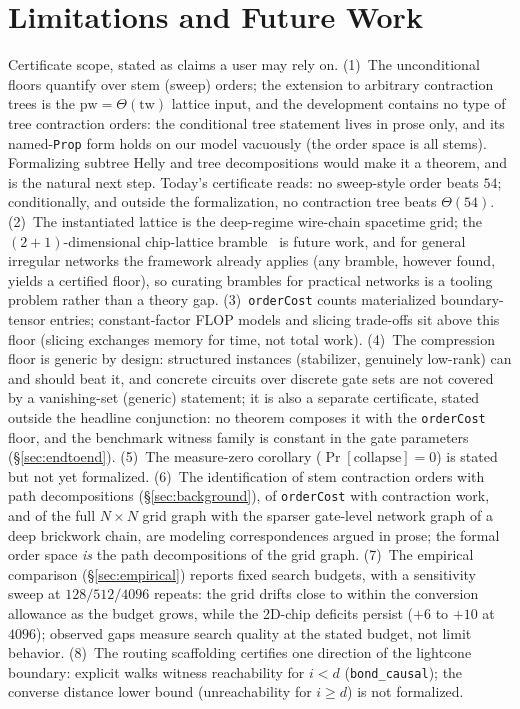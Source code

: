 \documentclass[sigplan,10pt,screen,review,anonymous]{acmart}
\newcommand{\pw}{\mathrm{pw}}
\newcommand{\tw}{\mathrm{tw}}
\begin{document}
\section{Limitations and Future Work}\label{sec:limits}

Certificate scope, stated as claims a user may rely on. (1)~The unconditional floors
quantify over stem (sweep) orders; the extension to arbitrary contraction trees is the
$\pw=\Theta(\tw)$ lattice input, and the development contains no type of tree contraction
orders: the conditional tree statement lives in prose only, and its named-\lstinline|Prop|
form holds on our model vacuously (the order space is all stems). Formalizing subtree
Helly and tree decompositions would make it a theorem, and is the natural next step. Today's
certificate reads: no sweep-style order beats $54$; conditionally, and outside the
formalization, no contraction tree beats $\Theta(54)$. (2)~The instantiated lattice is the deep-regime wire-chain spacetime
grid; the $(2{+}1)$-dimensional chip-lattice bramble~\cite{kozawa2014treewidth} is future
work, and for general irregular networks the framework already applies
(any bramble, however found, yields a certified floor), so curating brambles for practical networks is
a tooling problem rather than a theory gap. (3)~\lstinline|orderCost| counts materialized
boundary-tensor entries; constant-factor FLOP models and slicing trade-offs sit above this
floor (slicing exchanges memory for time, not total work). (4)~The compression floor is
generic by design: structured instances (stabilizer, genuinely low-rank) can and should
beat it, and concrete circuits over discrete gate sets are not covered by a
vanishing-set (generic) statement; it is also a separate certificate, stated outside the
headline conjunction: no theorem composes it
with the \lstinline|orderCost| floor, and the benchmark witness family is constant in the
gate parameters (\S\ref{sec:endtoend}). (5)~The measure-zero corollary ($\Pr[\text{collapse}]=0$) is
stated but not yet formalized. (6)~The identification of stem contraction orders with path
decompositions (\S\ref{sec:background}), of \lstinline|orderCost| with contraction
work, and of the full $N\times N$ grid graph with the sparser gate-level network graph of a
deep brickwork chain, are modeling correspondences argued in prose; the formal order space
\emph{is} the path decompositions of the grid graph. (7)~The empirical comparison (\S\ref{sec:empirical}) reports fixed search budgets, with a
sensitivity sweep at $128/512/4096$ repeats: the grid drifts close to within the
conversion allowance as the budget grows, while the 2D-chip deficits persist ($+6$ to
$+10$ at $4096$); observed gaps measure search quality at the stated budget, not limit
behavior. (8)~The routing scaffolding certifies one direction of the lightcone boundary:
explicit walks witness reachability for $i < d$ (\lstinline|bond_causal|); the converse
distance lower bound (unreachability for $i \ge d$) is not formalized.
\end{document}
